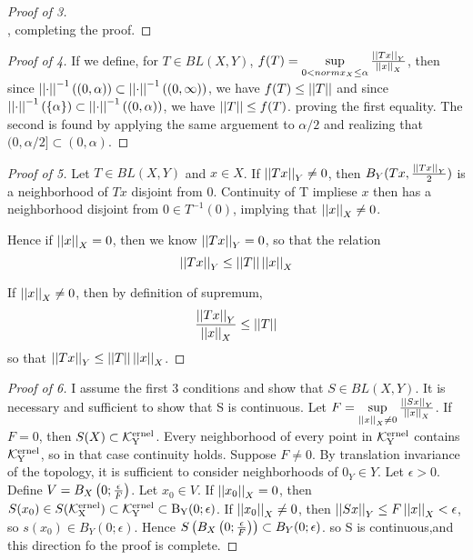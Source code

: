 \begin{prop}
\begin{proof}[Proof of 3]
\begin{equation}
    \end{equation}
    , completing the proof. 
\end{proof}
\begin{proof}[Proof of 4] 
If we define, for 
$T \in BL(X,Y)$, 
$f(T) = \sup\limits_{0 < norm{x}_X \leq \alpha} \frac{\left|\left| Tx \right|\right|_Y}{\left|\left| x \right|\right|_X}$, then
since $\left|\left| \cdot \right|\right|^{-1}((0,\alpha))\subset \left|\left| \cdot \right|\right|^{-1}((0,\infty))$, we have $f(T) \leq \left|\left| T \right|\right| $
and since $\left|\left| \cdot \right|\right|^{-1}(\{\alpha\})\subset \left|\left| \cdot \right|\right|^{-1}((0,\alpha))$, we have $\left|\left| T \right|\right| \leq f(T)$. proving the first equality.
The second is found by applying the same arguement to $\alpha/2$ and realizing that $(0,\alpha/2] \subset (0,\alpha)$. 
\end{proof}
\begin{proof}[Proof of 5]
Let $T \in BL(X,Y)$ and $x \in X$. 
If $\left|\left| Tx \right|\right|_Y \neq 0$, then $B_Y(Tx, \frac{\left|\left| Tx \right|\right|_Y}{2})$ is a neighborhood of $Tx$ disjoint from 0.
Continuity of T impliese $x$ then has a neighborhood disjoint from $0 \in T^{-1}(0)$, implying
that $\left|\left| x \right|\right|_X \neq 0$. 

Hence if $\left|\left| x \right|\right|_X = 0$, then we know $\left|\left| Tx \right|\right|_Y = 0$, so that the relation
\begin{equation}
\left|\left| Tx \right|\right|_Y \leq \left|\left| T \right|\right| \left|\left| x \right|\right|_X
\end{equation}

If $\left|\left| x \right|\right|_X \neq 0$, then by definition of supremum, 
\begin{equation*} 
\frac{\left|\left| Tx \right|\right|_Y}{\left|\left| x \right|\right|_X} \leq \left|\left| T \right|\right|
\end{equation*}
so that $\left|\left| Tx \right|\right|_Y \leq \left|\left| T \right|\right| \left|\left| x \right|\right|_X$. 
\end{proof}
\begin{proof}[Proof of 6]
    I assume the first 3 conditions
    and show that $S \in BL(X,Y)$.
    It is necessary and sufficient to 
    show that S is continuous.
    Let $F= \sup\limits_{\left|\left| x \right|\right|_X \neq 0} \frac{\left|\left| Sx \right|\right|_Y}{\left|\left| x \right|\right|_X}$.
    If $F=0$, then $S(X) \subset \bf\mathcal{K}\rm^{ernel}_Y$. 
    Every neighborhood of every point in $\bf\mathcal{K}\rm^{ernel}_Y$
    contains $\bf\mathcal{K}\rm^{ernel}_Y$, so in that case continuity holds. 
    Suppose $F \neq 0$. 
    By translation invariance of the topology, 
    it is sufficient to consider neighborhoods of $0_Y \in Y$. 
    Let $\epsilon > 0$. 
    Define $V=B_X\left( 0; \frac{\epsilon}{F}\right)$. 
    Let $x_0 \in V$. 
    If $\left|\left| x_0 \right|\right|_X = 0$, then
    $S(x_0) \in S(\bf\mathcal{K}\rm^{ernel}_X) \subset \bf\mathcal{K}\rm^{ernel}_Y \subset B_Y(0;\epsilon)$. 
    If $\left|\left| x_0 \right|\right|_X \neq 0$, then 
    $\left|\left| Sx \right|\right|_Y \leq F \left|\left| x \right|\right|_X < \epsilon$, so
    $s(x_0) \in B_Y(0;\epsilon)$. 
    Hence $S\left( B_X\left( 0;\frac{\epsilon}{F}\right)\right) \subset B_Y(0; \epsilon)$.
    so S is continuous,and this direction fo the proof is complete.


\end{proof}
\end{prop}
